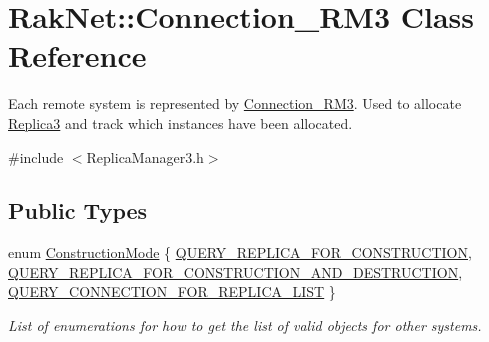 \hypertarget{class_rak_net_1_1_connection___r_m3}{\section{Rak\-Net\-:\-:Connection\-\_\-\-R\-M3 Class Reference}
\label{class_rak_net_1_1_connection___r_m3}
}


Each remote system is represented by \hyperlink{class_rak_net_1_1_connection___r_m3}{Connection\-\_\-\-R\-M3}. Used to allocate \hyperlink{class_rak_net_1_1_replica3}{Replica3} and track which instances have been allocated.  




{\ttfamily \#include $<$Replica\-Manager3.\-h$>$}

\subsection*{Public Types}
\begin{DoxyCompactItemize}
\item 
enum \hyperlink{class_rak_net_1_1_connection___r_m3_a1d176e2d5c47c15ca341d8efaecb637e}{Construction\-Mode} \{ \hyperlink{class_rak_net_1_1_connection___r_m3_a1d176e2d5c47c15ca341d8efaecb637ea5a5b467fa02165891a53b941b0e20516}{Q\-U\-E\-R\-Y\-\_\-\-R\-E\-P\-L\-I\-C\-A\-\_\-\-F\-O\-R\-\_\-\-C\-O\-N\-S\-T\-R\-U\-C\-T\-I\-O\-N}, 
\hyperlink{class_rak_net_1_1_connection___r_m3_a1d176e2d5c47c15ca341d8efaecb637ea6798d0f74d05dc9577b6fa5917b7aea5}{Q\-U\-E\-R\-Y\-\_\-\-R\-E\-P\-L\-I\-C\-A\-\_\-\-F\-O\-R\-\_\-\-C\-O\-N\-S\-T\-R\-U\-C\-T\-I\-O\-N\-\_\-\-A\-N\-D\-\_\-\-D\-E\-S\-T\-R\-U\-C\-T\-I\-O\-N}, 
\hyperlink{class_rak_net_1_1_connection___r_m3_a1d176e2d5c47c15ca341d8efaecb637ea55be3519ea316178e9a27300065e7544}{Q\-U\-E\-R\-Y\-\_\-\-C\-O\-N\-N\-E\-C\-T\-I\-O\-N\-\_\-\-F\-O\-R\-\_\-\-R\-E\-P\-L\-I\-C\-A\-\_\-\-L\-I\-S\-T}
 \}
\begin{DoxyCompactList}\small\item\em List of enumerations for how to get the list of valid objects for other systems. \end{DoxyCompactList}\end{DoxyCompactItemize}
